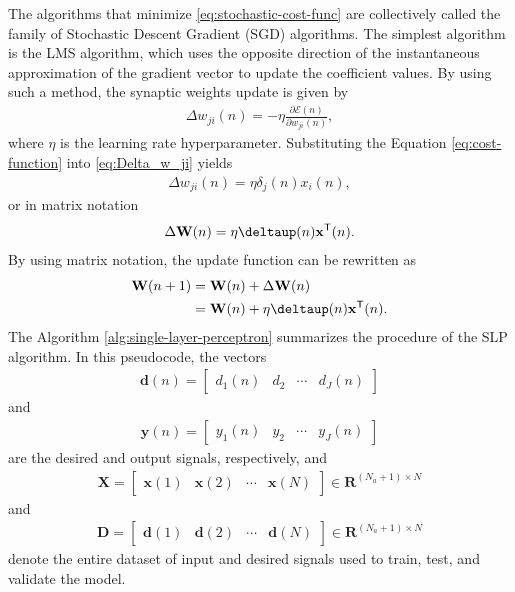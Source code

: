 \documentclass[12pt,a4paper]{article}
\newcommand{\trans}{\mathsf{T}}
\begin{document}
The algorithms that minimize \eqref{eq:stochastic-cost-func} are collectively called the family of Stochastic Descent Gradient (SGD) algorithms. The simplest algorithm is the LMS algorithm, which uses the opposite direction of the instantaneous approximation of the gradient vector to update the coefficient values. By using such a method, the synaptic weights update is given by
\begin{align}
    \Delta w_{ji}(n) = - \eta \frac{\partial \mathscr{E}(n)}{\partial w_{ji}(n)},
    \label{eq:Delta_w_ji}
\end{align}
where \(\eta\) is the learning rate hyperparameter. Substituting the Equation \eqref{eq:cost-function} into \eqref{eq:Delta_w_ji} yields
\begin{align}
    \Delta w_{ji}(n) = \eta \delta_j (n) x_i(n),
\end{align}
or in matrix notation
\begin{align}
    \Delta \mathbf{W}(n) = \eta\boldsymbol{\deltaup}(n) \mathbf{x}^\trans(n).
\end{align}
By using matrix notation, the update function can be rewritten as
\begin{align}
    \mathbf{W}(n+1) & = \mathbf{W}(n) + \Delta \mathbf{W}(n) \\
                    & = \mathbf{W}(n) + \eta \boldsymbol{\deltaup}(n) \mathbf{x}^\trans(n).
\end{align}
The Algorithm \ref{alg:single-layer-perceptron} summarizes the procedure of the SLP algorithm. In this pseudocode, the vectors
\begin{align}
    \mathbf{d}(n) = \begin{bmatrix}
        d_1(n) & d_2 & \cdots & d_J(n)
    \end{bmatrix}
\end{align}
and
\begin{align}
    \mathbf{y}(n) = \begin{bmatrix}
        y_1(n) & y_2 & \cdots & y_J(n)
    \end{bmatrix}
\end{align}
are the desired and output signals, respectively, and
\begin{align}
    \mathbf{X} = \begin{bmatrix}
        \mathbf{x}(1) & \mathbf{x}(2) & \cdots & \mathbf{x}(N)
    \end{bmatrix} \in \mathbf{R}^{(N_a+1) \times N}
\end{align}
and
\begin{align}
    \mathbf{D} = \begin{bmatrix}
        \mathbf{d}(1) & \mathbf{d}(2) & \cdots & \mathbf{d}(N)
    \end{bmatrix} \in \mathbf{R}^{(N_a+1) \times N}
\end{align}
denote the entire dataset of input and desired signals used to train, test, and validate the model.
\end{document}
